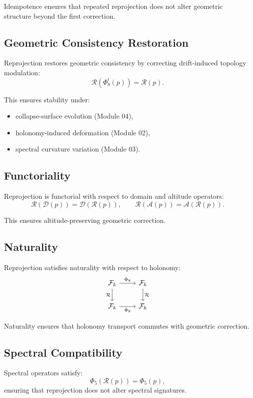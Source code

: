 Idempotence ensures that repeated reprojection does not alter geometric
structure beyond the first correction.

\subsection{Geometric Consistency Restoration}
Reprojection restores geometric consistency by correcting drift-induced
topology modulation:
\[
\mathcal{R}(\Phi_8^t(p)) = \mathcal{R}(p).
\]

This ensures stability under:
\begin{itemize}
    \item collapse-surface evolution (Module 04),
    \item holonomy-induced deformation (Module 02),
    \item spectral curvature variation (Module 03).
\end{itemize}

\subsection{Functoriality}
Reprojection is functorial with respect to domain and altitude operators:
\[
\mathcal{R}(\mathcal{D}(p)) = \mathcal{D}(\mathcal{R}(p)),
\qquad
\mathcal{R}(\mathcal{A}(p)) = \mathcal{A}(\mathcal{R}(p)).
\]

This ensures altitude-preserving geometric correction.

\subsection{Naturality}
Reprojection satisfies naturality with respect to holonomy:
\[
\begin{tikzcd}
\mathcal{F}_k \arrow[r,"\Phi_8"] \arrow[d,"\mathcal{R}"']
& \mathcal{F}_k \arrow[d,"\mathcal{R}"] \\
\mathcal{F}_k \arrow[r,"\Phi_8"']
& \mathcal{F}_k
\end{tikzcd}
\]

Naturality ensures that holonomy transport commutes with geometric correction.

\subsection{Spectral Compatibility}
Spectral operators satisfy:
\[
\Phi_5(\mathcal{R}(p)) = \Phi_5(p),
\]
ensuring that reprojection does not alter spectral signatures.

